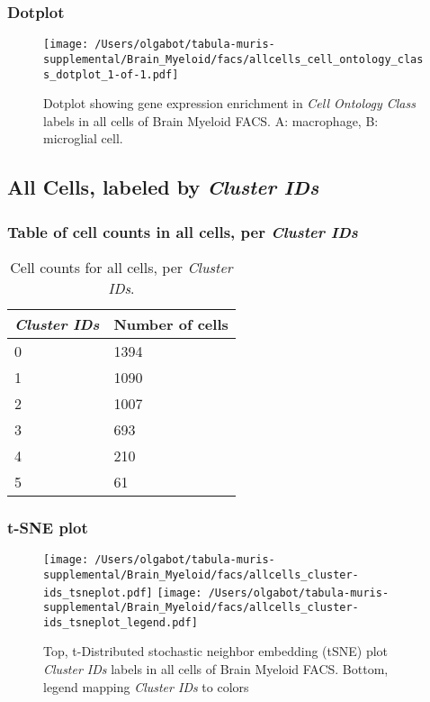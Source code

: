 \clearpage

\subsubsection{Dotplot}
\begin{figure}[h]
\centering
\texttt{[image: /Users/olgabot/tabula-muris-supplemental/Brain\_Myeloid/facs/allcells\_cell\_ontology\_class\_dotplot\_1-of-1.pdf]}

\caption{ Dotplot  showing gene expression enrichment in \emph{Cell Ontology Class} labels in all cells of Brain Myeloid FACS. A: macrophage, B: microglial cell.}
\end{figure}


\clearpage

\subsection{All Cells, labeled by \emph{Cluster IDs}}
\subsubsection{Table of cell counts in all cells, per \emph{Cluster IDs}}\begin{table}[h]
\centering
\label{my-label}
\begin{tabular}{@{}ll@{}}
\toprule

\emph{Cluster IDs}& Number of cells \\ \midrule
0 & 1394 \\

1 & 1090 \\

2 & 1007 \\

3 & 693 \\

4 & 210 \\

5 & 61 \\
\bottomrule
\end{tabular}
\caption{Cell counts for all cells, per \emph{Cluster IDs}.}
\end{table}

\clearpage
\subsubsection{t-SNE plot}
\begin{figure}[h]
\centering
\texttt{[image: /Users/olgabot/tabula-muris-supplemental/Brain\_Myeloid/facs/allcells\_cluster-ids\_tsneplot.pdf]}
\texttt{[image: /Users/olgabot/tabula-muris-supplemental/Brain\_Myeloid/facs/allcells\_cluster-ids\_tsneplot\_legend.pdf]}
\caption{Top, t-Distributed stochastic neighbor embedding (tSNE) plot  \emph{Cluster IDs} labels in all cells of Brain Myeloid FACS. Bottom, legend mapping \emph{Cluster IDs} to colors}
\end{figure}


